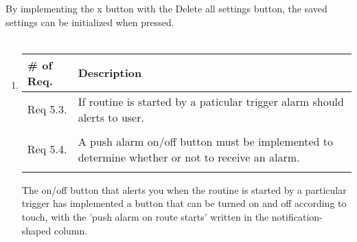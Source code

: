 \begin{enumerate}[label=\arabic*.]
\begin{enumerate}[label*={\arabic*.},ref=\theenumi.\arabic*]
                    By implementing the x button with the Delete all settings button, the saved settings can be initialized when pressed.\\\\
          \end{enumerate}

          \begin{enumerate}[label*={\arabic*.},ref=\theenumi.\arabic*]
              \setlength{\itemindent}{0.5cm}
              \item
                    \begin{table}[H]
                        \center
                        \begin{tabular}{m{1.8cm} m{4.5cm}}
                            \toprule
                            \# of Req. & Description                                     \\
                            \midrule
                            Req 5.3.   & If routine is started by a paticular trigger
                            alarm should alerts to user.                                 \\\\
                            Req 5.4.   & A push alarm on/off button must be
                            implemented to determine whether or not to receive an alarm. \\\\
                            \bottomrule
                        \end{tabular}
                    \end{table}

                    \begin{center}

                        \begin{center}
                        \end{center}
                    \end{center}
                    The on/off button that alerts you when the routine is started by a particular trigger has implemented a button that can be turned on and off according to touch, with the 'push alarm on route starts' written in the notification-shaped column.\\\\
          \end{enumerate}


\end{enumerate}
